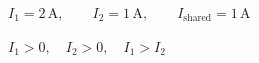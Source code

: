 \documentclass[border=12pt]{standalone}
\begin{document}
\color{weeknavy}
\parbox{13cm}{\centering $\displaystyle I_1=2\,\mathrm A,\qquad I_2=1\,\mathrm A,\qquad I_{\mathrm{shared}}=1\,\mathrm A$}
\vspace{4pt}
\parbox{13cm}{\centering $\displaystyle I_1>0,\quad I_2>0,\quad I_1>I_2$}
\end{document}

